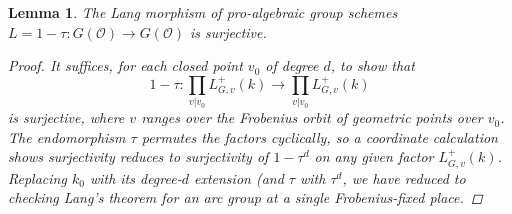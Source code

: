 \documentclass[openany]{amsbook}
\newtheorem{lemma}[theorem]{Lemma}
\theoremstyle{definition}
\theoremstyle{remark}
\numberwithin{equation}{section}
\renewcommand{\O}{\mathcal{O}}
\renewcommand{\-}{\operatorname{-}}
\begin{document}
\begin{lemma}\label{lem.Lang.GO}
    The Lang morphism of pro-algebraic group schemes $L = 1 - \tau : G(\O) \to G(\O)$ is surjective.
    \begin{proof}
    It suffices, for each closed point $v_0$ of degree $d$, to show that 
    $$
        1 - \tau : \prod_{v | v_0} L^+_{G,v}(k) \to \prod_{v | v_0} L^+_{G,v}(k)
    $$
    is surjective, where $v$ ranges over the Frobenius orbit of geometric points over $v_0$. The endomorphism $\tau$ permutes the factors cyclically, so a coordinate calculation shows surjectivity reduces to surjectivity of $1 - \tau^d$ on any given factor $L^+_{G,v}(k)$. Replacing $k_0$ with its degree-$d$ extension (and $\tau$ with $\tau^d$, we have reduced to checking Lang's theorem for an arc group at a single Frobenius-fixed place.
    

\end{proof}
\end{lemma}
\end{document}
